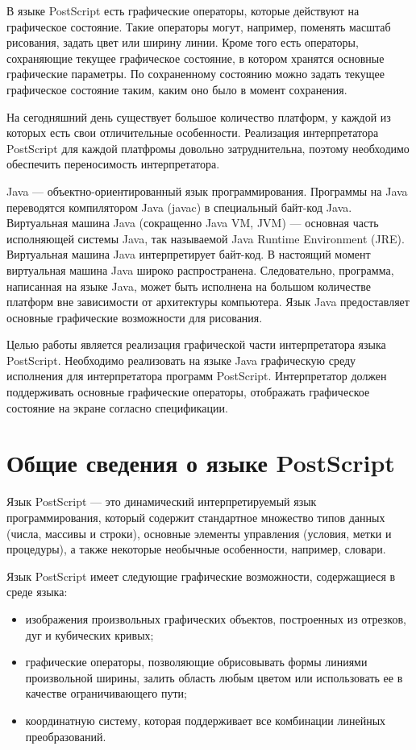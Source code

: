 В языке PostScript есть графические операторы, которые действуют на графическое состояние. Такие операторы могут, например, поменять масштаб рисования, задать цвет или ширину линии. Кроме того есть операторы, сохраняющие текущее графическое состояние, в котором хранятся основные графические параметры. По сохраненному состоянию можно задать текущее графическое состояние таким, каким оно было в момент сохранения.  

На сегодняшний день существует большое количество платформ, у каждой из которых есть свои отличительные особенности. Реализация интерпретатора PostScript для каждой платфромы довольно затруднительна, поэтому  необходимо обеспечить переносимость интерпретатора. 

 Java --- объектно-ориентированный язык программирования. Программы на Java переводятся компилятором Java (javac)  в специальный байт-код Java. Виртуальная машина Java (сокращенно Java VM, JVM) --- основная часть исполняющей системы Java, так называемой Java Runtime Environment (JRE). Виртуальная машина Java интерпретирует байт-код. В настоящий момент виртуальная машина Java широко распространена. Следовательно, программа, написанная на языке Java, может быть исполнена на большом количестве платформ вне зависимости от архитектуры компьютера. Язык Java предоставляет основные графические возможности для рисования. 
 
Целью работы является реализация графической части интерпретатора языка PostScript.  Необходимо реализовать на языке Java графическую среду исполнения для интерпретатора программ PostScript. Интерпретатор должен поддерживать основные графические операторы, отображать графическое состояние на экране согласно спецификации.

\section{Общие сведения о языке PostScript}
Язык PostScript --- это динамический интерпретируемый язык программирования, который содержит стандартное множество типов данных (числа, массивы и строки), основные элементы управления (условия, метки и процедуры), а также некоторые необычные особенности, например, словари. 


Язык PostScript имеет следующие графические возможности, содержащиеся в среде языка:
\begin{itemize}
\item изображения произвольных графических объектов, построенных из отрезков, дуг и кубических кривых;
\item графические операторы, позволяющие обрисовывать формы линиями произвольной ширины, залить область любым цветом или использовать ее в качестве ограничивающего пути;
\item координатную систему, которая поддерживает все комбинации линейных преобразований.
\end{itemize}

